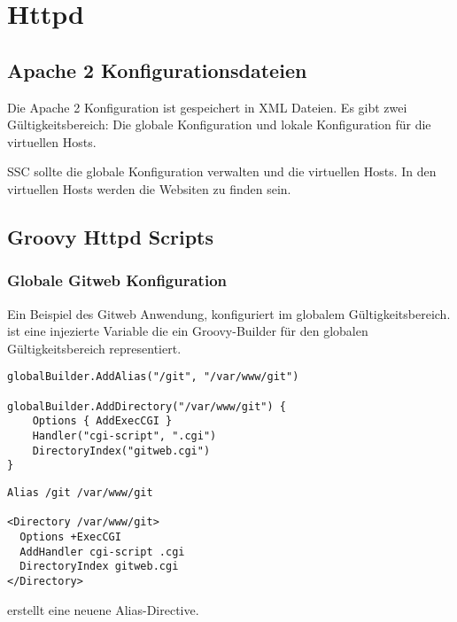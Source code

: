\section{Httpd}

\subsection{Apache 2 Konfigurationsdateien}

Die Apache 2 Konfiguration ist gespeichert in XML Dateien. Es gibt zwei
Gültigkeitsbereich: Die globale Konfiguration und lokale Konfiguration für die
virtuellen Hosts.

SSC sollte die globale Konfiguration verwalten und die virtuellen Hosts. In den
virtuellen Hosts werden die Websiten zu finden sein.

\subsection{Groovy Httpd Scripts}

\subsubsection{Globale Gitweb Konfiguration}

Ein Beispiel des Gitweb Anwendung, konfiguriert im globalem Gültigkeitsbereich.
 ist eine injezierte Variable die ein Groovy-Builder
für den globalen Gültigkeitsbereich representiert.

\begin{multicols}{2}
\begin{lstlisting}[style=Java, caption=Gitweb Httpd Script]
globalBuilder.AddAlias("/git", "/var/www/git")

globalBuilder.AddDirectory("/var/www/git") {
    Options { AddExecCGI }
    Handler("cgi-script", ".cgi")
    DirectoryIndex("gitweb.cgi")
}
\end{lstlisting}

\begin{lstlisting}[style=XML, caption=Gitweb Configuration]
Alias /git /var/www/git

<Directory /var/www/git>
  Options +ExecCGI
  AddHandler cgi-script .cgi
  DirectoryIndex gitweb.cgi
</Directory>
\end{lstlisting}
\end{multicols}

 erstellt eine neuene Alias-Directive.

